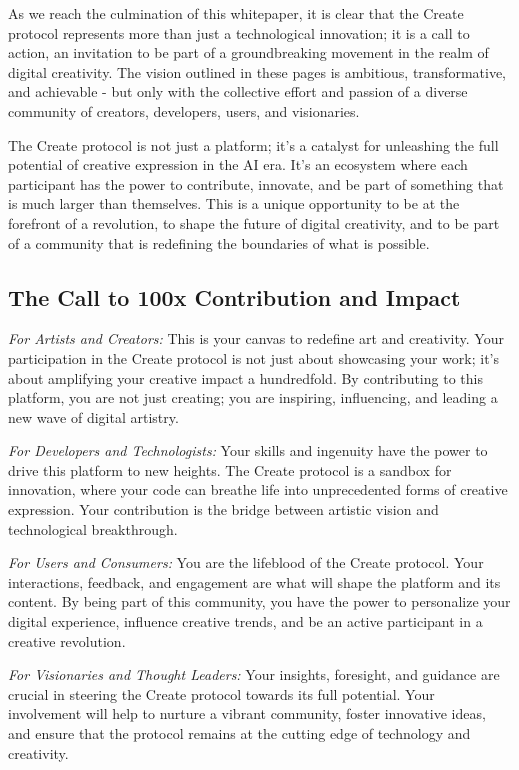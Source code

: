 \documentclass[12pt,a4paper]{article}
\begin{document}
As we reach the culmination of this whitepaper, it is clear that the Create protocol represents more than just a technological innovation; it is a call to action, an invitation to be part of a groundbreaking movement in the realm of digital creativity. The vision outlined in these pages is ambitious, transformative, and achievable - but only with the collective effort and passion of a diverse community of creators, developers, users, and visionaries.

The Create protocol is not just a platform; it's a catalyst for unleashing the full potential of creative expression in the AI era. It's an ecosystem where each participant has the power to contribute, innovate, and be part of something that is much larger than themselves. This is a unique opportunity to be at the forefront of a revolution, to shape the future of digital creativity, and to be part of a community that is redefining the boundaries of what is possible.

\subsection*{The Call to 100x Contribution and Impact}

\textit{For Artists and Creators:} This is your canvas to redefine art and creativity. Your participation in the Create protocol is not just about showcasing your work; it's about amplifying your creative impact a hundredfold. By contributing to this platform, you are not just creating; you are inspiring, influencing, and leading a new wave of digital artistry.

\textit{For Developers and Technologists:} Your skills and ingenuity have the power to drive this platform to new heights. The Create protocol is a sandbox for innovation, where your code can breathe life into unprecedented forms of creative expression. Your contribution is the bridge between artistic vision and technological breakthrough.

\textit{For Users and Consumers:} You are the lifeblood of the Create protocol. Your interactions, feedback, and engagement are what will shape the platform and its content. By being part of this community, you have the power to personalize your digital experience, influence creative trends, and be an active participant in a creative revolution.

\textit{For Visionaries and Thought Leaders:} Your insights, foresight, and guidance are crucial in steering the Create protocol towards its full potential. Your involvement will help to nurture a vibrant community, foster innovative ideas, and ensure that the protocol remains at the cutting edge of technology and creativity.
\end{document}
